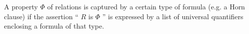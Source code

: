 A property  $  \Phi  $  of relations is
 captured by a certain type of formula (e.g. a Horn clause)
if the assertion `` $ R $  is  $  \Phi  $ '' is expressed by a list of
universal quantifiers enclosing a formula of that type.